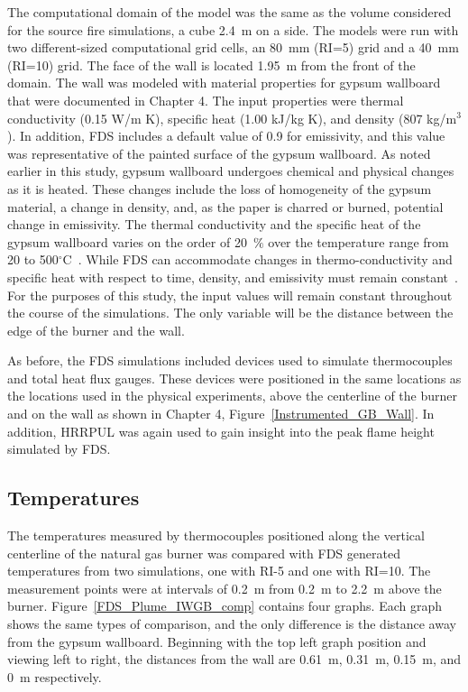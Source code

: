 \documentclass[twoside]{uocthesis}
\begin{document}
{The computational domain of the model was the same as the volume considered for the source fire simulations, a cube 2.4~m on a side. The models were run with two different-sized computational grid cells, an 80~mm (RI=5) grid and a 40~mm (RI=10) grid.  The face of the wall is located 1.95~m from the front of the domain.  
The wall was modeled with material properties for gypsum wallboard that were documented in Chapter 4.  The input properties were thermal conductivity (0.15 W/m K), specific heat (1.00 kJ/kg K), and density (807 kg/m$^3$).  In addition, FDS includes a default value of 0.9 for emissivity, and this value was representative of the painted surface of the gypsum wallboard. As noted earlier in this study, gypsum wallboard undergoes chemical and physical changes as it is heated.  These changes include the loss of homogeneity of the gypsum material, a change in density, and, as the paper is charred or burned, potential change in emissivity.  The thermal conductivity and the specific heat of the gypsum wallboard varies on the order of 20~$\%$ over the temperature range from 20 to 500$^\circ$C~\cite{Gross:1985}.  While FDS can accommodate changes in thermo-conductivity and specific heat with respect to time, density, and emissivity must remain constant~\cite{FDS_Users_Guide}.  For the purposes of this study, the input values will remain constant throughout the course of the simulations.  The only variable will be the distance between the edge of the burner and the wall.

As before, the FDS simulations included devices used to simulate thermocouples and total heat flux gauges.  These devices were positioned in the same locations as the locations used in the physical experiments, above the centerline of the burner and on the wall as shown in Chapter 4, Figure~\ref{Instrumented_GB_Wall}. In addition, HRRPUL was again used to gain insight into the peak flame height simulated by FDS.  

\subsection{Temperatures}

 The temperatures measured by thermocouples positioned along the vertical centerline of the natural gas burner was compared with FDS generated temperatures from two simulations, one with RI-5 and one with RI=10.  The measurement points were at intervals of 0.2~m from 0.2~m to 2.2~m above the burner.  Figure~\ref{FDS_Plume_IWGB_comp} contains four graphs.  Each graph shows the same types of comparison, and the only difference is the distance away from the gypsum wallboard.  Beginning with the top left graph position and viewing left to right, the distances from the wall are 0.61~m, 0.31~m, 0.15~m, and 0~m respectively.  

}
\end{document}
